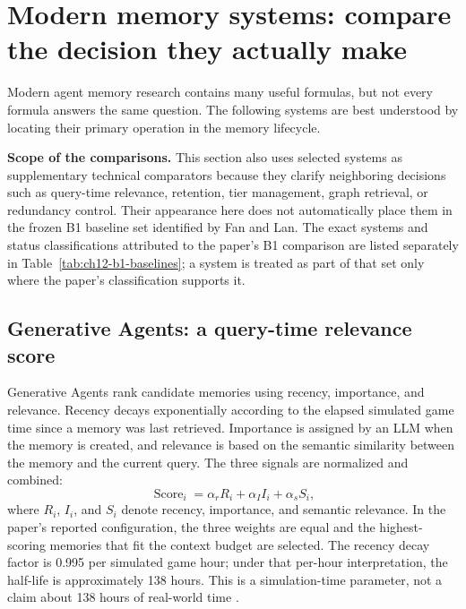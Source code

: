 \section{Modern memory systems: compare the decision they actually make}
\label{sec:ch12-modern-systems}

Modern agent memory research contains many useful formulas, but not every formula answers the same question. The following systems are best understood by locating their primary operation in the memory lifecycle.

\begin{notebox}
\textbf{Scope of the comparisons.} This section also uses selected systems as supplementary technical comparators because they clarify neighboring decisions such as query-time relevance, retention, tier management, graph retrieval, or redundancy control. Their appearance here does not automatically place them in the frozen B1 baseline set identified by Fan and Lan. The exact systems and status classifications attributed to the paper's B1 comparison are listed separately in Table~\ref{tab:ch12-b1-baselines}; a system is treated as part of that set only where the paper's classification supports it.
\end{notebox}

\subsection{Generative Agents: a query-time relevance score}
\label{subsec:ch12-generative-agents}

Generative Agents rank candidate memories using recency, importance, and relevance. Recency decays exponentially according to the elapsed simulated game time since a memory was last retrieved. Importance is assigned by an LLM when the memory is created, and relevance is based on the semantic similarity between the memory and the current query. The three signals are normalized and combined:
\begin{equation}
  \operatorname{Score}_i = \alpha_r R_i + \alpha_I I_i + \alpha_s S_i,
  \label{eq:ch12-generative-score}
\end{equation}
where \(R_i\), \(I_i\), and \(S_i\) denote recency, importance, and semantic relevance. In the paper's reported configuration, the three weights are equal and the highest-scoring memories that fit the context budget are selected. The recency decay factor is 0.995 per simulated game hour; under that per-hour interpretation, the half-life is approximately 138 hours. This is a simulation-time parameter, not a claim about 138 hours of real-world time \autocite{park2023generative}.

